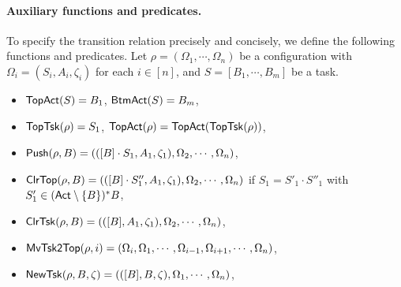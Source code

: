 \paragraph{Auxiliary functions and predicates.} To specify the transition relation precisely and concisely, we define the following functions and predicates. 
Let $\rho = (\Omega_1,\cdots,\Omega_n)$ be a configuration with $\Omega_i = (S_i,A_i,\zeta_i)$ for each $i\in[n]$, and $S=[B_1,\cdots,B_m]$ be a task. 
\begin{itemize}
    \item $\mathsf{TopAct}(S) = B_1$, ${\sf BtmAct}(S) = B_m$, %
	\item $\mathsf{TopTsk}(\rho) = S_1$,  %
        $\mathsf{TopAct}(\rho) = \mathsf{TopAct}(\mathsf{TopTsk}(\rho))$, %
	
    \item $\mathsf{Push}(\rho, B) = (([B] \cdot S_1,A_1,\zeta_1), \Omega_2, \cdots, \Omega_n)$,
    	
    \item $\mathsf{ClrTop}(\rho, B) = (([B]\cdot S_1'',A_1,\zeta_1),\Omega_2,\cdots, \Omega_n)$ if $S_1=S'_1 \cdot S''_1$ with $S'_1 \in ({\sf Act} \setminus \{B\})^*B$,
	
    \item $\mathsf{ClrTsk}(\rho, B)  = (([B],A_1,\zeta_1),\Omega_2,\cdots, \Omega_n)$,
	
    \item $\mathsf{MvTsk2Top}(\rho, i) = (\Omega_i,\Omega_1,\cdots,\Omega_{i-1},\Omega_{i+1},\cdots,\Omega_n)$,

    \item $\mathsf{NewTsk}(\rho, B, \zeta)  = (([B],B,\zeta),\Omega_1,\cdots, \Omega_n)$,
	

\end{itemize}
